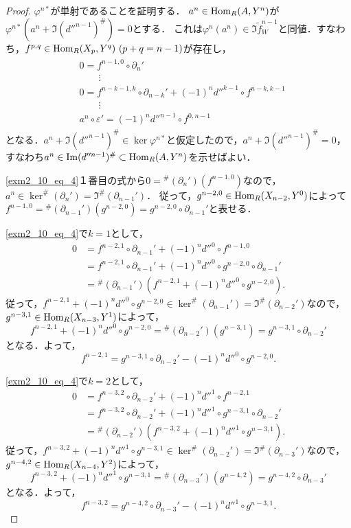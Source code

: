 \begin{proof}
  $\varphi^{n\ast}$が単射であることを証明する．
  $a^n \in \operatorname{Hom}_R(A, Y^n)$が$\varphi^{n\ast}(a^n + \Im (d''^{n-1})^\#) = 0$とする．
  これは$\varphi^n(a^n) \in \Im \tilde{f}_W^{n-1}$と同値．すなわち，$f^{p, q} \in \operatorname{Hom}_R(X_p, Y^q)~(p+q=n-1)$が存在し，
  \begin{align}
    \begin{split}
      & 0 = f^{n-1, 0} \circ \partial_n' \\
      & \qquad \vdots \\
      & 0 = f^{n-k-1, k} \circ \partial_{n-k}' + (-1)^n d''^{k-1} \circ f^{n-k, k-1} \\
      & \qquad \vdots \\
      & a^n \circ \varepsilon' = (-1)^n d''^{n-1} \circ f^{0, n-1}
    \end{split}
    \label{exm2_10_eq_4}
  \end{align}
  となる．$a^n + \Im (d''^{n-1})^\# \in \ker \varphi^{n\ast}$と仮定したので，$a^n + \Im (d''^{n-1})^\# = 0$，すなわち$a^n \in \operatorname{Im} (d''^{n-1})^\# \subset \operatorname{Hom}_R(A, Y^n)$を示せばよい．

  \eqref{exm2_10_eq_4}１番目の式から$0 = {}^\# (\partial_n')(f^{n-1, 0})$なので，$a^n \in \ker ^\# (\partial_n') = \Im ^\# (\partial_{n-1}')$．
  従って，$g^{n-2, 0} \in \operatorname{Hom}_R(X_{n-2}, Y^0)$によって$f^{n-1, 0} = {}^\# (\partial_{n-1}')(g^{n-2, 0}) = g^{n-2, 0} \circ \partial_{n-1}'$と表せる．

  \eqref{exm2_10_eq_4}で$k=1$として，
  \begin{align*}
    0 & = f^{n-2, 1} \circ \partial_{n-1}' + (-1)^n d''^{0} \circ f^{n-1, 0} \\
    & = f^{n-2, 1} \circ \partial_{n-1}' + (-1)^n d''^{0} \circ g^{n-2, 0} \circ \partial_{n-1}' \\
    & = {}^\#(\partial_{n-1}') \left( f^{n-2, 1} + (-1)^n d''^{0} \circ g^{n-2, 0} \right).
  \end{align*}
  従って，$f^{n-2, 1} + (-1)^n d''^{0} \circ g^{n-2, 0} \in \ker ^\#(\partial_{n-1}') = \Im ^\#(\partial_{n-2}')$なので，$g^{n-3, 1} \in \operatorname{Hom}_R(X_{n-3}, Y^1)$によって，
  \[ f^{n-2, 1} + (-1)^n d''^{0} \circ g^{n-2, 0} = {}^\#(\partial_{n-2}')(g^{n-3, 1}) = g^{n-3, 1} \circ \partial_{n-2}' \]
  となる．よって，
  \[ f^{n-2, 1} = g^{n-3, 1} \circ \partial_{n-2}' - (-1)^n d''^{0} \circ g^{n-2, 0}. \]

  \eqref{exm2_10_eq_4}で$k=2$として，
  \begin{align*}
    0 & = f^{n-3, 2} \circ \partial_{n-2}' + (-1)^n d''^{1} \circ f^{n-2, 1} \\
    & = f^{n-3, 2} \circ \partial_{n-2}' + (-1)^n d''^{1} \circ g^{n-3, 1} \circ \partial_{n-2}' \\
    & = {}^\#(\partial_{n-2}') \left( f^{n-3, 2} + (-1)^n d''^{1} \circ g^{n-3, 1} \right).
  \end{align*}
  従って，$f^{n-3, 2} + (-1)^n d''^{1} \circ g^{n-3, 1} \in \ker ^\#(\partial_{n-2}') = \Im ^\#(\partial_{n-3}')$なので，$g^{n-4, 2} \in \operatorname{Hom}_R(X_{n-4}, Y^2)$によって，
  \[ f^{n-3, 2} + (-1)^n d''^{1} \circ g^{n-3, 1} = {}^\#(\partial_{n-3}')(g^{n-4, 2}) = g^{n-4, 2} \circ \partial_{n-3}' \]
  となる．よって，
  \[ f^{n-3, 2} = g^{n-4, 2} \circ \partial_{n-3}' - (-1)^n d''^{1} \circ g^{n-3, 1}. \]


\end{proof}
